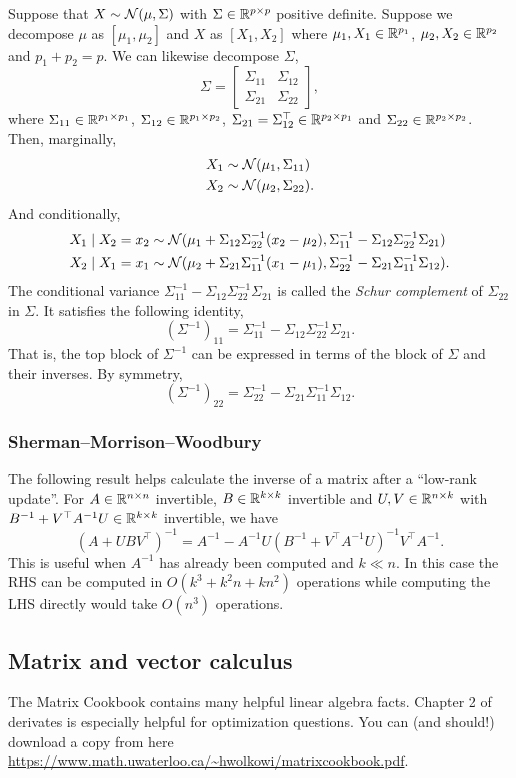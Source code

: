 Suppose that $X \sim {\mathcal N}(\mu,\Sigma)$ with $\Sigma \in \mathbb{R}^{p \times p}$ positive definite. Suppose we decompose $\mu$  as $[\mu_1,\mu_2]$ and $X$ as $[X_1,X_2]$ where $\mu_1,X_1 \in \mathbb{R}^{p_1}$, $\mu_2,X_2 \in \mathbb{R}^{p_2}$ and $p_1+p_2 = p$. We can likewise decompose $\Sigma$,
\[\Sigma = \begin{bmatrix}
    \Sigma_{11}&\Sigma_{12}\\
    \Sigma_{21}&\Sigma_{22}
\end{bmatrix}, \]
where $\Sigma_{11} \in \mathbb{R}^{p_1 \times p_1}$, $\Sigma_{12} \in \mathbb{R}^{p_1 \times p_2}$, $\Sigma_{21} =\Sigma_{12}^\top \in \mathbb{R}^{p_2 \times p_1}$ and $\Sigma_{22} \in \mathbb{R}^{p_2 \times p_2}$. Then, marginally,
\begin{align*}
    X_1 &\sim {\mathcal N}(\mu_1,\Sigma_{11})\\
    X_2 &\sim {\mathcal N}(\mu_2,\Sigma_{22}).
\end{align*}
And conditionally,
\begin{align*}
    X_1 \mid X_2 = x_2 & \sim {\mathcal N}(\mu_1 + \Sigma_{12}\Sigma_{22}^{-1}(x_2-\mu_2), \Sigma_{11}^{-1} - \Sigma_{12}\Sigma_{22}^{-1}\Sigma_{21})\\
    X_2 \mid X_1 = x_1 & \sim {\mathcal N}(\mu_2 + \Sigma_{21}\Sigma_{11}^{-1}(x_1-\mu_1), \Sigma_{22}^{-1} - \Sigma_{21}\Sigma_{11}^{-1}\Sigma_{12}).
\end{align*}
The conditional variance $\Sigma_{11}^{-1} - \Sigma_{12}\Sigma_{22}^{-1}\Sigma_{21}$ is called the \emph{Schur complement} of $\Sigma_{22}$ in $\Sigma$. It satisfies the following identity,
\[(\Sigma^{-1})_{11} =  \Sigma_{11}^{-1} - \Sigma_{12}\Sigma_{22}^{-1}\Sigma_{21}. \]
That is, the top block of $\Sigma^{-1}$ can be expressed in terms of the block of $\Sigma$ and their inverses. By symmetry,
\[ (\Sigma^{-1})_{22} =  \Sigma_{22}^{-1} - \Sigma_{21}\Sigma_{11}^{-1}\Sigma_{12}.\]

\subsubsection*{Sherman--Morrison--Woodbury}

The following result helps calculate the inverse of a matrix after a ``low-rank update''. For $A \in \mathbb{R}^{n \times n}$ invertible, $B \in \mathbb{R}^{k \times k}$ invertible and $U,V \in \mathbb{R}^{n \times k}$ with $B^{-1}+V^\top A^{-1}U \in \mathbb{R}^{k \times k}$ invertible, we have
\[(A + UBV^\top)^{-1} =  A^{-1} - A^{-1}U\left(B^{-1}+V^\top A^{-1}U \right)^{-1}V^\top A^{-1}.\]
This is useful when $A^{-1}$ has already been computed and $k \ll n$. In this case the RHS can be computed in $O(k^3+k^2n+kn^2)$ operations while computing the LHS directly would take $O(n^3)$ operations. 

\subsection{Matrix and vector calculus}

The Matrix Cookbook contains many helpful linear algebra facts. Chapter 2 of derivates is especially helpful for optimization questions. You can (and should!) download a copy from here \url{https://www.math.uwaterloo.ca/~hwolkowi/matrixcookbook.pdf}. 

